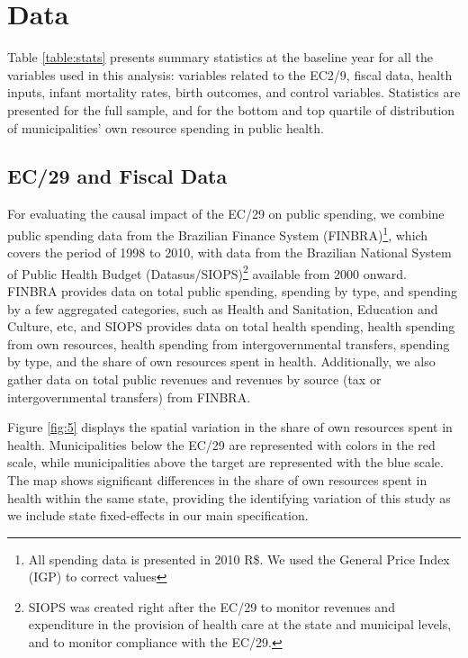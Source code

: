 \section{Data}\label{sec:data}

Table \ref{table:stats} presents summary statistics at the baseline year for all the variables used in this analysis: variables related to the EC2/9, fiscal data, health inputs, infant mortality rates, birth outcomes, and control variables. Statistics are presented for the full sample, and for the bottom and top quartile of distribution of municipalities' own resource spending in public health.

\subsection{EC/29 and Fiscal Data}

For evaluating the causal impact of the EC/29 on public spending, we combine public spending data from the Brazilian Finance System (FINBRA)\footnote{All spending data is presented in 2010 R\$. We used the General Price Index (IGP) to correct values}, which covers the period of 1998 to 2010, with data from the Brazilian National System of Public Health Budget (Datasus/SIOPS)\footnote{SIOPS was created right after the EC/29 to monitor revenues and expenditure in the provision of health care at the state and municipal levels, and to monitor compliance with the EC/29.} available from 2000 onward. FINBRA provides data on total public spending, spending by type, and spending by a few aggregated categories, such as Health and Sanitation, Education and Culture, etc, and SIOPS provides data on total health spending, health spending from own resources, health spending from intergovernmental transfers, spending by type, and the share of own resources spent in health.  Additionally, we also gather data on total public revenues and revenues by source (tax or intergovernmental transfers) from FINBRA.


Figure \ref{fig:5} displays the spatial variation in the share of own resources spent in health. Municipalities below the EC/29 are represented with colors in the red scale, while municipalities above the target are represented with the blue scale. The map shows significant differences in the share of own resources spent in health within the same state, providing the identifying variation of this study as we include state fixed-effects in our main specification. 




